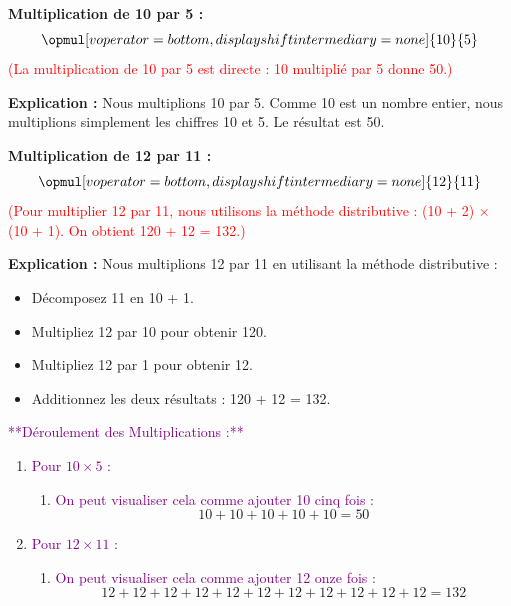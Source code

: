 \documentclass{article}
\begin{document}
\begin{tcolorbox}[colback=orange!10!white, colframe=orange!75!black, sharp corners=south, boxrule=0.8mm, title=Explication des Exemples]
    \textbf{Multiplication de 10 par 5 :}
    \[
    \opmul[voperator=bottom, displayshiftintermediary=none]{10}{5}
    \]
    \textcolor{red}{(La multiplication de 10 par 5 est directe : 10 multiplié par 5 donne 50.)}
    
    \textbf{Explication :} Nous multiplions 10 par 5. Comme 10 est un nombre entier, nous multiplions simplement les chiffres 10 et 5. Le résultat est 50.

    \textbf{Multiplication de 12 par 11 :}
    \[
    \opmul[voperator=bottom, displayshiftintermediary=none]{12}{11}
    \]
    \textcolor{red}{(Pour multiplier 12 par 11, nous utilisons la méthode distributive : (10 + 2) × (10 + 1). On obtient 120 + 12 = 132.)}
    
    \textbf{Explication :} Nous multiplions 12 par 11 en utilisant la méthode distributive : 
    \begin{itemize}
        \item Décomposez 11 en 10 + 1.
        \item Multipliez 12 par 10 pour obtenir 120.
        \item Multipliez 12 par 1 pour obtenir 12.
        \item Additionnez les deux résultats : 120 + 12 = 132.
    \end{itemize}
\end{tcolorbox}

\vspace{0.4cm}

\textcolor{purple}{**Déroulement des Multiplications :**}

\begin{enumerate}
    \item \textcolor{purple}{Pour \(10 \times 5\) :}
    \begin{enumerate}
        \item \textcolor{purple}{On peut visualiser cela comme ajouter 10 cinq fois :}
        \[
        10 + 10 + 10 + 10 + 10 = 50
        \]
    \end{enumerate}

    \item \textcolor{purple}{Pour \(12 \times 11\) :}
    \begin{enumerate}
        \item \textcolor{purple}{On peut visualiser cela comme ajouter 12 onze fois :}
        \[
        12 + 12 + 12 + 12 + 12 + 12 + 12 + 12 + 12 + 12 + 12 = 132
        \]
    \end{enumerate}
\end{enumerate}
\end{document}
